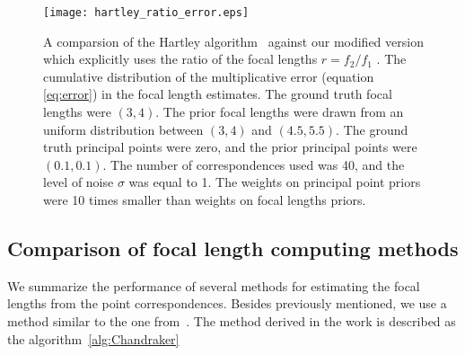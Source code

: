\begin{figure}
  \begin{center}
    \texttt{[image: hartley\_ratio\_error.eps]}
    \caption[Performance of Hartley solver with or without using ratio]{A comparsion of the Hartley algorithm~\cite{HartleyPriors} against our modified version which explicitly uses the ratio of the focal lengths $r = f_2 \slash f_1$ .  The cumulative distribution  of the  multiplicative error (equation \ref{eq:error})  in the focal  length  estimates.  The ground truth focal lengths were $(3,4)$. The prior focal lengths  were  drawn from an uniform distribution between $(3,4)$ and $(4.5, 5.5)$. The ground truth principal points were zero, and the prior principal points were $(0.1, 0.1)$. The number of correspondences used was 40, and the level of noise $\sigma$ was equal to 1. The weights on principal point priors were 10 times smaller than weights on focal lengths priors. }
    \label{hartley_ratio}
  \end{center}
\end{figure}

\subsection{Comparison of focal length computing methods}

We summarize the performance of several methods for estimating the focal lengths from the point correspondences. Besides previously mentioned, we use a method similar to the one from~\cite{Chandraker}. The method derived in the work is described as the algorithm~\ref{alg:Chandraker}


